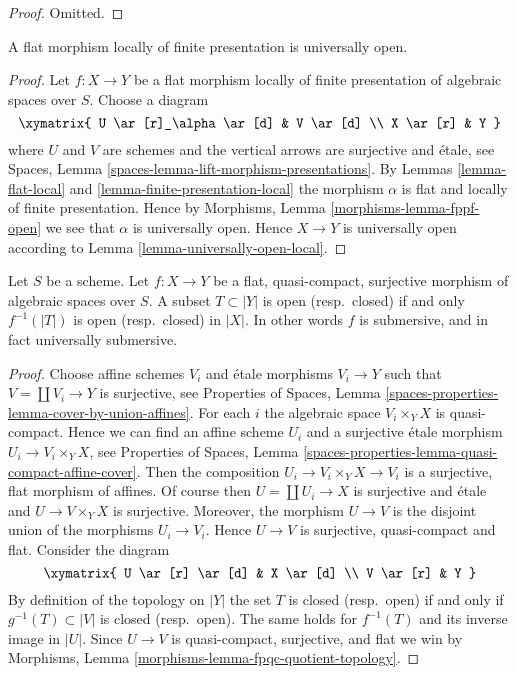 \begin{proof}
Omitted.
\end{proof}

\begin{lemma}
\label{lemma-fppf-open}
A flat morphism locally of finite presentation is universally open.
\end{lemma}

\begin{proof}
Let $f : X \to Y$ be a flat morphism locally of finite presentation
of algebraic spaces over $S$. Choose a diagram
$$
\xymatrix{
U \ar[r]_\alpha \ar[d] & V \ar[d] \\
X \ar[r] & Y
}
$$
where $U$ and $V$ are schemes and the vertical arrows are surjective and
\'etale, see
Spaces, Lemma \ref{spaces-lemma-lift-morphism-presentations}.
By
Lemmas \ref{lemma-flat-local} and \ref{lemma-finite-presentation-local}
the morphism $\alpha$ is flat and locally of finite presentation.
Hence by
Morphisms, Lemma \ref{morphisms-lemma-fppf-open}
we see that $\alpha$ is universally open.
Hence $X \to Y$ is universally open according to
Lemma \ref{lemma-universally-open-local}.
\end{proof}

\begin{lemma}
\label{lemma-fpqc-quotient-topology}
Let $S$ be a scheme.
Let $f : X \to Y$ be a flat, quasi-compact, surjective morphism of
algebraic spaces over $S$.
A subset $T \subset |Y|$ is open (resp.\ closed) if and only
$f^{-1}(|T|)$ is open (resp.\ closed) in $|X|$.
In other words $f$ is submersive, and in fact universally submersive.
\end{lemma}

\begin{proof}
Choose affine schemes $V_i$ and \'etale morphisms $V_i \to Y$ such that
$V = \coprod V_i \to Y$ is surjective, see
Properties of Spaces,
Lemma \ref{spaces-properties-lemma-cover-by-union-affines}.
For each $i$ the algebraic space $V_i \times_Y X$ is quasi-compact.
Hence we can find an affine scheme $U_i$ and a surjective \'etale morphism
$U_i \to V_i \times_Y X$, see
Properties of Spaces,
Lemma \ref{spaces-properties-lemma-quasi-compact-affine-cover}.
Then the composition $U_i \to V_i \times_Y X \to V_i$ is a surjective,
flat morphism of affines.
Of course then $U = \coprod U_i \to X$ is surjective and \'etale
and $U \to V \times_Y X$ is surjective. Moreover, the morphism $U \to V$ is the
disjoint union of the morphisms $U_i \to V_i$. Hence $U \to V$ is surjective,
quasi-compact and flat. Consider the diagram
$$
\xymatrix{
U \ar[r] \ar[d] & X \ar[d] \\
V \ar[r] & Y
}
$$
By definition of the topology on $|Y|$ the set $T$ is closed
(resp.\ open) if and only if $g^{-1}(T) \subset |V|$ is closed
(resp.\ open). The same holds for
$f^{-1}(T)$ and its inverse image in $|U|$.
Since $U \to V$ is quasi-compact, surjective,  and flat we win by
Morphisms, Lemma \ref{morphisms-lemma-fpqc-quotient-topology}.
\end{proof}

